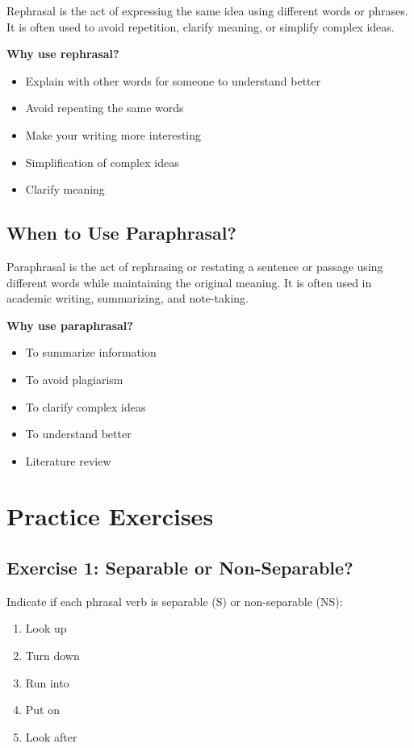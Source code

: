 Rephrasal is the act of expressing the same idea using different words or phrases. It is often used to avoid repetition, clarify meaning, or simplify complex ideas.

\textbf{Why use rephrasal?}
\begin{itemize}
    \item Explain with other words for someone to understand better
    \item Avoid repeating the same words
    \item Make your writing more interesting
    \item Simplification of complex ideas
    \item Clarify meaning
\end{itemize}

\subsection{When to Use Paraphrasal?}

Paraphrasal is the act of rephrasing or restating a sentence or passage using different words while maintaining the original meaning. It is often used in academic writing, summarizing, and note-taking.

\textbf{Why use paraphrasal?}
\begin{itemize}
    \item To summarize information
    \item To avoid plagiarism
    \item To clarify complex ideas
    \item To understand better
    \item Literature review
\end{itemize}

\section{Practice Exercises}

\subsection{Exercise 1: Separable or Non-Separable?}
Indicate if each phrasal verb is separable (S) or non-separable (NS):

\begin{enumerate}
    \item Look up \underline{\hspace{2cm}}
    \item Turn down \underline{\hspace{2cm}}
    \item Run into \underline{\hspace{2cm}}
    \item Put on \underline{\hspace{2cm}}
    \item Look after \underline{\hspace{2cm}}
\end{enumerate}

